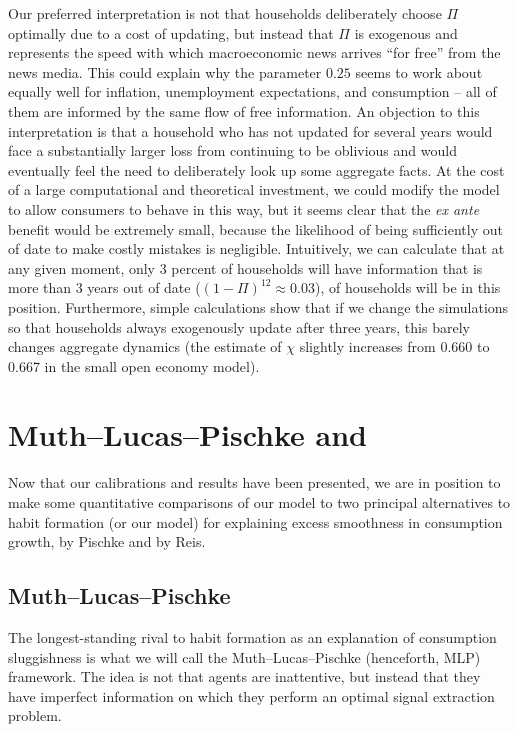 \documentclass[titlepage]{./econtex}
\begin{document}
Our preferred interpretation is not that households deliberately choose $\Pi$ optimally due to a cost of updating, but instead that $\Pi$ is exogenous and represents the speed with which macroeconomic news arrives ``for free'' from the news media.  This could explain why the parameter $0.25$ seems to work about equally well for inflation, unemployment expectations, and consumption -- all of them are informed by the same flow of free information. An objection to this interpretation is that a household who has not updated for several years would face a substantially larger loss from continuing to be oblivious and would eventually feel the need to deliberately look up some aggregate facts.  At the cost of a large computational and theoretical investment, we could modify the model to allow consumers to behave in this way, but it seems clear that the {\it ex ante} benefit would be extremely small, because the likelihood of being sufficiently out of date to make costly mistakes is negligible.  Intuitively, we can calculate that at any given moment, only 3 percent of households will have information that is more than 3 years out of date ($(1-\Pi)^{12} \approx 0.03$), of households will be in this position.  Furthermore, simple calculations show that if we change the simulations so that households always exogenously update after three years, this barely changes aggregate dynamics (the estimate of $\chi$ slightly increases from 0.660 to 0.667 in the small open economy model).

\hypertarget{MuthLucasPischke}{}
\section{Muth--Lucas--Pischke and \cite{reis:inattentive}} \label{sec:Comparisons}

Now that our calibrations and results have been presented, we are in position to make some quantitative comparisons of our model to two principal alternatives to habit formation (or our model) for explaining excess smoothness in consumption growth, by Pischke and by Reis.

\subsection{Muth--Lucas--Pischke}
The longest-standing rival to habit formation as an explanation of consumption sluggishness is what we will call the Muth--Lucas--Pischke (henceforth, MLP) framework.  The idea is not that agents are inattentive, but instead that they have imperfect information on which they perform an optimal signal extraction problem.
\end{document}
